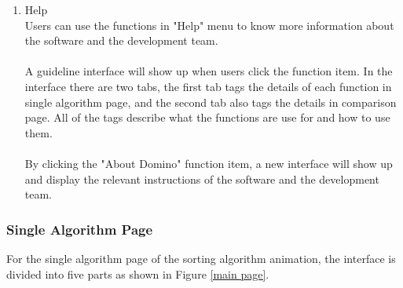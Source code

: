 \documentclass[paper=a4, fontsize=11pt,twoside]{scrartcl}		%
\begin{document}
\begin{enumerate}
\item Help \\
Users can use the functions in "Help" menu to know more information about the software and the development team.\\\\
 A guideline interface will show up when users click the function item. In the interface there are two tabs, the first tab tags the details of each function in single algorithm page, and the second tab also tags the details in comparison page. All of the tags describe what the functions are use for and how to use them.\\\\
 By clicking the "About Domino" function item, a new interface will show up and display the relevant instructions of the software and the development team.\\
\end{enumerate}


\subsubsection{Single Algorithm Page}
For the single algorithm page of the sorting algorithm animation, the interface is divided into five parts as shown in Figure \ref{main page}.
\end{document}
